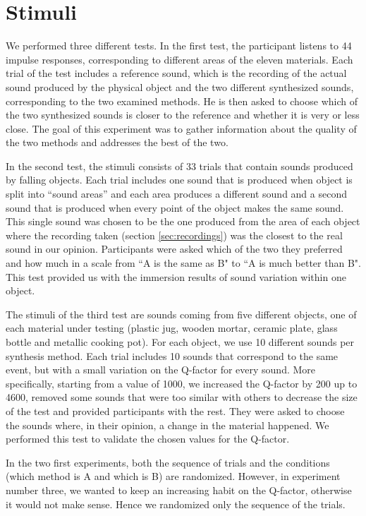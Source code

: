 \section{Stimuli}
We performed three different tests. In the first test, the participant listens to 44 impulse responses, corresponding to different areas of the eleven materials. Each trial of the test includes a reference sound, which is the recording of the actual sound produced by the physical object and the two different synthesized sounds, corresponding to the two examined methods. He is then asked to choose which of the two synthesized sounds is closer to the reference and whether it is very or less close. The goal of this experiment was to gather information about the quality of the two methods and addresses the best of the two.

In the second test, the stimuli consists of 33 trials that contain sounds produced by falling objects. Each trial includes one sound that is produced when object is split into ``sound areas'' and each area produces a different sound and a second sound that is produced when every point of the object makes the same sound. This single sound was chosen to be the one produced from the area of each object where the recording taken (section \ref{sec:recordings}) was the closest to the real sound in our opinion. Participants were asked which of the two they preferred and how much in a scale from ``A is the same as B" to ``A is much better than B". This test provided us with the immersion results of sound variation within one object.

The stimuli of the third test are sounds coming from five different objects, one of each material under testing (plastic jug, wooden mortar, ceramic plate, glass bottle and metallic cooking pot). For each object, we use 10 different sounds per synthesis method. Each trial includes 10 sounds that correspond to the same event, but with a small variation on the Q-factor for every sound. More specifically, starting from a value of 1000, we increased the Q-factor by 200 up to 4600, removed some sounds that were too similar with others to decrease the size of the test and provided participants with the rest. They were asked to choose the sounds where, in their opinion, a change in the material happened. We performed this test to validate the chosen values for the Q-factor.

In the two first experiments, both the sequence of trials and the conditions (which method is A and which is B) are randomized. However, in experiment number three, we wanted to keep an increasing habit on the Q-factor, otherwise it would not make sense. Hence we randomized only the sequence of the trials.

